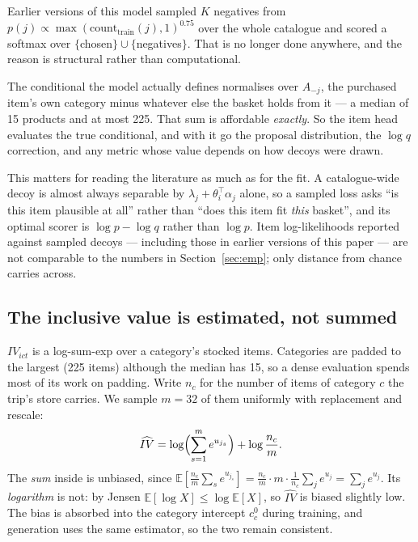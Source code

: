 \documentclass[11pt]{article}
\begin{document}
Earlier versions of this model sampled $K$ negatives from
$p(j)\propto\max(\mathrm{count}_{\text{train}}(j),1)^{0.75}$ over the whole catalogue and
scored a softmax over $\{$chosen$\}\cup\{$negatives$\}$. That is no longer done anywhere,
and the reason is structural rather than computational.

The conditional the model actually defines normalises over $A_{-j}$, the purchased item's
own category minus whatever else the basket holds from it --- a median of 15 products and at
most 225. That sum is affordable \emph{exactly}. So the item head evaluates the true
conditional, and with it go the proposal distribution, the $\log q$ correction, and any
metric whose value depends on how decoys were drawn.

This matters for reading the literature as much as for the fit. A catalogue-wide decoy is
almost always separable by $\lambda_j+\theta_i^{\top}\alpha_j$ alone, so a sampled loss asks
``is this item plausible at all'' rather than ``does this item fit \emph{this} basket'', and
its optimal scorer is $\log p-\log q$ rather than $\log p$. Item log-likelihoods reported
against sampled decoys --- including those in earlier versions of this paper --- are not
comparable to the numbers in Section~\ref{sec:emp}; only distance from chance carries
across.

\subsection{The inclusive value is estimated, not summed}
\label{sec:iv}

$IV_{ict}$ is a log-sum-exp over a category's stocked items. Categories are padded to the
largest (225 items) although the median has 15, so a dense evaluation spends
most of its work on padding. Write $n_c$ for the number of items of category $c$ the trip's store carries. We sample
$m=32$ of them uniformly with replacement and rescale:
\begin{equation}
\widehat{IV}=\log\Bigl(\sum_{s=1}^{m}e^{u_{j_s}}\Bigr)+\log\frac{n_c}{m}.
\end{equation}
The \emph{sum} inside is unbiased, since
$\mathbb E[\frac{n_c}{m}\sum_s e^{u_{j_s}}]=\frac{n_c}{m}\cdot m\cdot\frac{1}{n_c}\sum_j e^{u_j}
=\sum_j e^{u_j}$. Its \emph{logarithm} is not: by Jensen
$\mathbb E[\log X]\le\log\mathbb E[X]$, so $\widehat{IV}$ is biased slightly low. The bias
is absorbed into the category intercept $c^0_c$ during training, and generation uses the
same estimator, so the two remain consistent.
\end{document}
